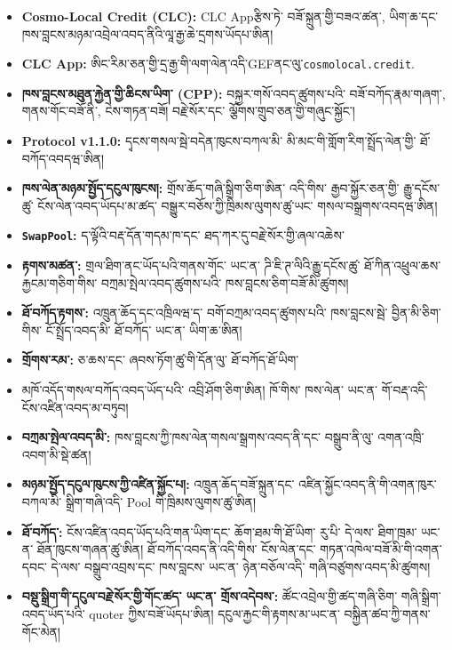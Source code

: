 \documentclass[11pt]{article}
\begin{document}
\begin{itemize}[leftmargin=*]
\item \textbf{Cosmo-Local Credit (CLC):} CLC Appརྩིས་ཏེ་ བཟོ་སྐྲུན་གྱི་བཟའ་ཚན་, ཡིག་ཆ་དང་ ཁས་བླངས་མཉམ་འབྲེལ་འབད་ནིའི་ལཱ་རྒྱ་ཆེ་དྲགས་ཡོདཔ་ཨིན།
\item \textbf{CLC App:} ཨིང་རིམ་ཅན་གྱི་དྲ་རྒྱ་གི་ལག་ལེན་འདི་GEFནང་ལུ་\texttt{cosmolocal.credit}.
\item \textbf{ཁས་བླངས་མཐུན་རྐྱེན་གྱི་ཆིངས་ཡིག་ (CPP):} བསྐྱར་གསོ་འབད་ཚུགས་པའི་ བཟོ་བཀོད་རྣམ་གཞག་, གནས་གོང་བཟོ་ནི་, ངེས་གཏན་བཟོ། བརྗེ་སོར་དང་ ལྕོགས་གྲུབ་ཅན་གྱི་གཞུང་སྐྱོང་།
\item \textbf{Protocol v1.1.0:} དྭངས་གསལ་སྦེ་བདེན་ཁུངས་བཀལ་མི་ མི་མང་གི་གློག་རིག་སྤྲོད་ལེན་གྱི་ ཐོ་བཀོད་འབདཝ་ཨིན།
\item \textbf{ཁས་ལེན་མཉམ་སྤྱོད་དངུལ་ཁུངས།:} གྲོས་ཆོད་གཞི་སྒྲིག་ཅིག་ཨིན་ འདི་གིས་ རྒྱབ་སྐྱོར་ཅན་གྱི་ རྒྱུ་དངོས་ཚུ་ ངོས་ལེན་འབད་ཡོདཔ་མ་ཚད་ བསྒྱུར་བཅོས་ཀྱི་ཁྲིམས་ལུགས་ཚུ་ཡང་ གསལ་བསྒྲགས་འབདཝ་ཨིན།
\item \textbf{\texttt{SwapPool}:} ད་ལྟོའི་བརྡ་དོན་གདམ་ཁ་དང་ ཐད་ཀར་དུ་བརྗེ་སོར་གྱི་ཞལ་འཆེས་
\item \textbf{རྟགས་མཚན་:} གྲལ་ཐིག་ནང་ཡོད་པའི་གནས་གོང་ ཡང་ན་ ཌི་ཇི་ཊ་ལིའི་རྒྱུ་དངོས་ཚུ་ ཐོ་ཀིན་འཕྲུལ་ཆས་རྐྱངམ་གཅིག་གིས་ བཀྲམ་སྤེལ་འབད་ཚུགས་པའི་ ཁས་བླངས་ཅིག་བཟོ་མི་ཚུགས།
\item \textbf{ཐོ་བཀོད་རྟགས་:} འཁྲུན་ཆོད་དང་འཁྲིལཝ་ད་ བགོ་བཀྲམ་འབད་ཚུགས་པའི་ ཁས་བླངས་སྦེ་ བྱིན་མི་ཅིག་གིས་ ངོ་སྤྲོད་འབད་མི་ ཐོ་བཀོད་ ཡང་ན་ ཡིག་ཆ་ཨིན།
\item \textbf{གྲོགས་རམ་:} ཅ་ཆས་དང་ ཞབས་ཏོག་ཚུ་གི་དོན་ལུ་ ཐོ་བཀོད་ཐོ་ཡིག་
\item མཁོ་འདོད་གསལ་བཀོད་འབད་ཡོད་པའི་ འབྲི་ཤོག་ཅིག་ཨིན། ཁོ་གིས་ ཁས་ལེན་ ཡང་ན་ གོ་བརྡ་འདི་ ངོས་འཛིན་འབད་མ་བཏུབ།
\item \textbf{བཀྲམ་སྤེལ་འབད་མི་:} ཁས་བླངས་ཀྱི་ཁས་ལེན་གསལ་སྒྲགས་འབད་ནི་དང་ བསྒྲུབ་ནི་ལུ་ འགན་འཁྲི་འབག་མི་སྡེ་ཚན།
\item \textbf{མཉམ་སྤྱོད་དངུལ་ཁུངས་ཀྱི་འཛིན་སྐྱོང་པ།:} འཁྲུན་ཆོད་བཟོ་སྐྲུན་དང་ འཛིན་སྐྱོང་འབད་ནི་གི་འགན་ཁུར་བཀལ་མི་ སྒྲིག་གཞི་འདི་ Pool གི་ཁྲིམས་ལུགས་ཚུ་ཨིན།
\item \textbf{ཐོ་བཀོད་:} ངོས་འཛིན་འབད་ཡོད་པའི་གན་ཡིག་དང་ ཆོག་ཐམ་གི་ཐོ་ཡིག་ རུ་པི་ དེ་ལས་ ཐིག་ཁྲམ་ ཡང་ན་ ཐོན་ཁུངས་གཞན་ཚུ་ཨིན། ཐོ་བཀོད་འབད་ནི་འདི་གིས་ ངོས་ལེན་དང་ གཏན་འཁེལ་བཟོ་མི་གི་འགན་དབང་ དེ་ལས་ བསྒྲུབ་འབྲས་དང་ ཁས་བླངས་ ཡང་ན་ ཉེན་བཅོལ་འདི་ གཞི་བཙུགས་འབད་མི་ཚུགས།
\item \textbf{བསྡུ་སྒྲིག་གི་དངུལ་བརྗེ་སོར་གྱི་གོང་ཚད་ ཡང་ན་ གྲོས་འདེབས་:} ཚོང་འབྲེལ་གྱི་ཚད་གཞི་ཅིག་ གཞི་སྒྲིག་འབད་ཡོད་པའི་ quoter ཀྱིས་བཟོ་ཡོདཔ་ཨིན། དངུལ་རྐྱང་གི་རྟགས་མ་ཡང་ན་ བསྐྱིན་ཚབ་ཀྱི་གནས་གོང་མེན།

\end{itemize}
\end{document}
